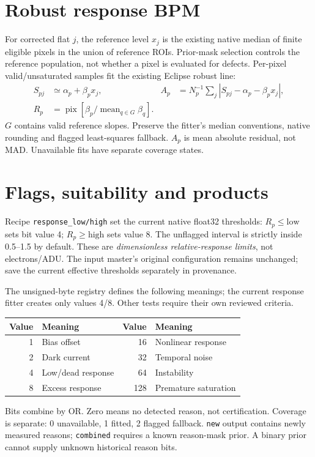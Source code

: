 \documentclass[10pt,a4paper]{article}
\begin{document}
\section*{Robust response BPM}
For corrected flat $j$, the reference level $x_j$ is the existing native median
of finite eligible pixels in the union of reference ROIs. Prior-mask selection
controls the reference population, not whether a pixel is evaluated for defects.
Per-pixel valid/unsaturated samples fit the existing Eclipse robust line:
\begin{align}
S_{pj}&\simeq\alpha_p+\beta_px_j, &
A_p&=N_p^{-1}\sum_j|S_{pj}-\alpha_p-\beta_px_j|,\\
R_p&=\operatorname{pix}\left[\beta_p/
 \operatorname{mean}_{q\in G}\beta_q\right].
\end{align}
$G$ contains valid reference slopes. Preserve the fitter's median conventions,
native rounding and flagged least-squares fallback. $A_p$ is mean absolute
residual, not MAD. Unavailable fits have separate coverage states.

\newpage
\section*{Flags, suitability and products}
Recipe \texttt{response\_low/high} set the current native float32 thresholds:
$R_p\leq\mathrm{low}$ sets bit value 4; $R_p\geq\mathrm{high}$ sets value 8.
The unflagged interval is strictly inside 0.5--1.5 by default. These are
\emph{dimensionless relative-response limits}, not electrons/ADU. The input
master's original configuration remains unchanged; save the current effective
thresholds separately in provenance.

The unsigned-byte registry defines the following meanings; the current response
fitter creates only values 4/8. Other tests require their own reviewed criteria.
\begin{center}
\begin{tabular}{r l r l}
\textbf{Value} & \textbf{Meaning} & \textbf{Value} & \textbf{Meaning}\\\hline
1 & Bias offset & 16 & Nonlinear response\\
2 & Dark current & 32 & Temporal noise\\
4 & Low/dead response & 64 & Instability\\
8 & Excess response & 128 & Premature saturation\\
\end{tabular}
\end{center}
Bits combine by OR. Zero means no detected reason, not certification. Coverage
is separate: 0 unavailable, 1 fitted, 2 flagged fallback. \texttt{new} output
contains newly measured reasons; \texttt{combined} requires a known reason-mask
prior. A binary prior cannot supply unknown historical reason bits.
\end{document}
